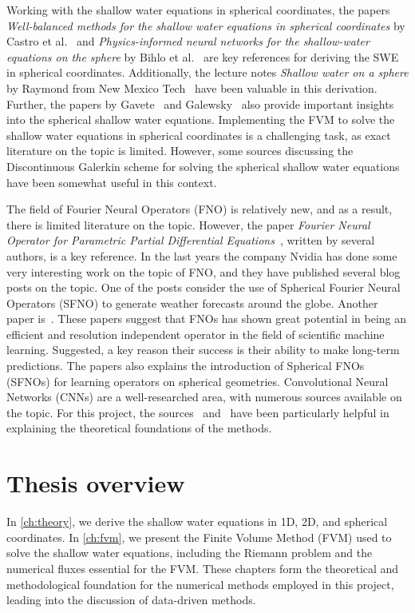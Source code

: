 Working with the shallow water equations in spherical coordinates, the papers \textit{Well-balanced methods for the shallow water equations in spherical coordinates} by Castro et al.~\cite{Castro2017} and \textit{Physics-informed neural networks for the shallow-water equations on the sphere} by Bihlo et al.~\cite{Bihlo2022} are key references for deriving the SWE in spherical coordinates.
Additionally, the lecture notes \textit{Shallow water on a sphere} by Raymond from New Mexico Tech~\cite{Raymond} have been valuable in this derivation.
Further, the papers by Gavete~\cite{Gavete_2009} and Galewsky~\cite{Galewsky_2004} also provide important insights into the spherical shallow water equations.
Implementing the FVM to solve the shallow water equations in spherical coordinates is a challenging task, as exact literature on the topic is limited.
However, some sources discussing the Discontinuous Galerkin scheme for solving the spherical shallow water equations have been somewhat useful in this context.

The field of Fourier Neural Operators (FNO) is relatively new, and as a result, there is limited literature on the topic.
However, the paper \textit{Fourier Neural Operator for Parametric Partial Differential Equations}~\cite{FNO_2021}, written by several authors, is a key reference.
In the last years the company Nvidia has done some very interesting work on the topic of FNO, and they have published several blog posts on the topic.
One of the posts consider the use of Spherical Fourier Neural Operators (SFNO) to generate weather forecasts around the globe\cite{Nvidia2023}.
Another paper is~\cite{bonev2023-SFNO}.
These papers suggest that FNOs has shown great potential in being an efficient and resolution independent operator in the field of scientific machine learning.
Suggested, a key reason their success is their ability to make long-term predictions. 
The papers also explains the introduction of Spherical FNOs (SFNOs) for learning operators on spherical geometries.
Convolutional Neural Networks (CNNs) are a well-researched area, with numerous sources available on the topic.
For this project, the sources~\cite{oshea2015introductionconvolutionalneuralnetworks} and~\cite{chollet2017comprehensive} have been particularly helpful in explaining the theoretical foundations of the methods.

\section{Thesis overview}
In \autoref{ch:theory}, we derive the shallow water equations in 1D, 2D, and spherical coordinates.
In \autoref{ch:fvm}, we present the Finite Volume Method (FVM) used to solve the shallow water equations, including the Riemann problem and the numerical fluxes essential for the FVM.
These chapters form the theoretical and methodological foundation for the numerical methods employed in this project, leading into the discussion of data-driven methods.

